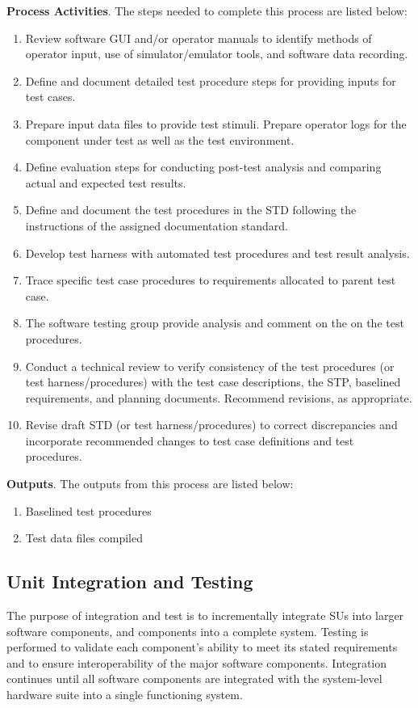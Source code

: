 \documentclass[a4paper, 11pt]{article}
\begin{document}
\textbf{Process Activities}. The steps needed to complete this process are listed below:
\begin{enumerate}
	\item Review software GUI and/or operator manuals to identify methods of operator input, use of simulator/emulator tools, and software data recording.
	\item Define and document detailed test procedure steps for providing inputs for test cases.
	\item Prepare input data files to provide test stimuli. Prepare operator logs for the component	under test as well as the test environment.
	\item Define evaluation steps for conducting post-test analysis and comparing actual and expected test results.
	\item Define and document the test procedures in the STD following the instructions of the	assigned documentation standard.
	\item Develop test harness with automated test procedures and test
	result analysis.
	\item Trace specific test case procedures to requirements allocated to parent test case.
	\item The software testing group provide analysis and comment on the on the test procedures.
	\item Conduct a technical review to verify consistency of the test procedures (or test harness/procedures) with the test case descriptions, the STP, baselined requirements, and planning documents. Recommend revisions, as appropriate.
	\item Revise draft STD (or test harness/procedures) to correct discrepancies and incorporate recommended changes to test case definitions and test procedures.
\end{enumerate}

\textbf{Outputs}. The outputs from this process are listed below:
\begin{enumerate}
	\item Baselined test procedures
	\item Test data files compiled
\end{enumerate}

\subsection{Unit Integration and Testing}
The purpose of integration and test is to incrementally integrate SUs into larger software components, and components into a complete system. Testing is performed to validate each component's ability to meet its stated requirements and to ensure interoperability of the major
software components.
Integration continues until all software components are integrated with the system-level hardware suite into a single functioning system.
\end{document}
